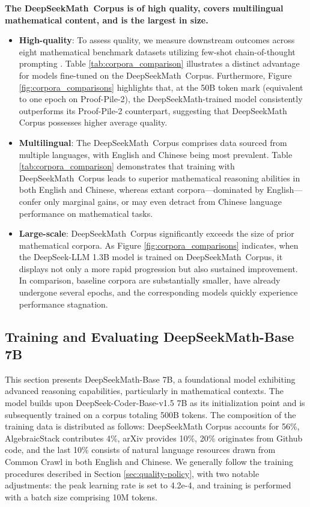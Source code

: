 \textbf{The DeepSeekMath~Corpus is of high quality, covers multilingual mathematical content, and is the largest in size.}

\begin{itemize}[topsep=0pt]
    \item \textbf{High-quality}:
    To assess quality, we measure downstream outcomes across eight mathematical benchmark datasets utilizing few-shot chain-of-thought prompting \cite{cot}. Table \ref{tab:corpora_comparison} illustrates a distinct advantage for models fine-tuned on the DeepSeekMath~Corpus. Furthermore, Figure \ref{fig:corpora_comparisons} highlights that, at the 50B token mark (equivalent to one epoch on Proof-Pile-2), the DeepSeekMath-trained model consistently outperforms its Proof-Pile-2 counterpart, suggesting that DeepSeekMath Corpus possesses higher average quality.
    \item \textbf{Multilingual}:
    The DeepSeekMath~Corpus comprises data sourced from multiple languages, with English and Chinese being most prevalent. Table \ref{tab:corpora_comparison} demonstrates that training with DeepSeekMath~Corpus leads to superior mathematical reasoning abilities in both English and Chinese, whereas extant corpora—dominated by English—confer only marginal gains, or may even detract from Chinese language performance on mathematical tasks.
    \item \textbf{Large-scale}:
    DeepSeekMath~Corpus significantly exceeds the size of prior mathematical corpora. As Figure \ref{fig:corpora_comparisons} indicates, when the DeepSeek-LLM 1.3B model is trained on DeepSeekMath~Corpus, it displays not only a more rapid progression but also sustained improvement. In comparison, baseline corpora are substantially smaller, have already undergone several epochs, and the corresponding models quickly experience performance stagnation.
\end{itemize}

\subsection{Training and Evaluating DeepSeekMath-Base 7B}

This section presents DeepSeekMath-Base 7B, a foundational model exhibiting advanced reasoning capabilities, particularly in mathematical contexts. The model builds upon DeepSeek-Coder-Base-v1.5 7B \citep{deepseek-coder} as its initialization point and is subsequently trained on a corpus totaling 500B tokens. The composition of the training data is distributed as follows: DeepSeekMath Corpus accounts for 56\%, AlgebraicStack contributes 4\%, arXiv provides 10\%, 20\% originates from Github code, and the last 10\% consists of natural language resources drawn from Common Crawl in both English and Chinese. We generally follow the training procedures described in Section \ref{sec:quality-policy}, with two notable adjustments: the peak learning rate is set to 4.2e-4, and training is performed with a batch size comprising 10M tokens.

